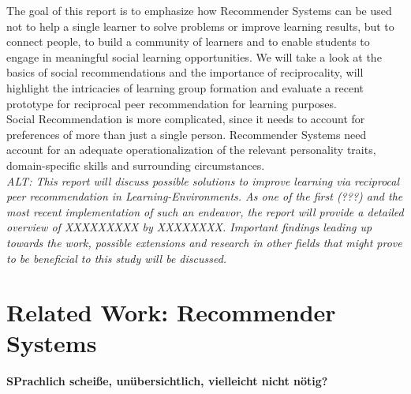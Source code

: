 \documentclass[nochapterpage,bigchapter,linedtoc,longdoc,colorback,accentcolor=tud3b]{tudreport}
\begin{document}
The goal of this report is to emphasize how Recommender Systems can be used not to help a single learner to solve problems or improve learning results, but to connect people, to build a community of learners and to enable students to engage in meaningful social learning opportunities. We will take a look at the basics of social recommendations and the importance of reciprocality, will highlight the intricacies of learning group formation and evaluate a recent prototype for reciprocal peer recommendation for learning purposes.\\
Social Recommendation is more complicated, since it needs to account for preferences of more than just a single person. Recommender Systems need account for an adequate operationalization of the relevant personality traits, domain-specific skills and surrounding circumstances.\\
\textit{ALT: This report will discuss possible solutions to improve learning via reciprocal peer recommendation in Learning-Environments. As one of the first (???) and the most recent implementation of such an endeavor, the report will provide a detailed overview of XXXXXXXXX by XXXXXXXX. Important findings leading up towards the work, possible extensions and research in other fields that might prove to be beneficial to this study will be discussed.}\\

\chapter{Related Work: Recommender Systems}
\textbf{SPrachlich scheiße, unübersichtlich, vielleicht nicht nötig?}
\end{document}
